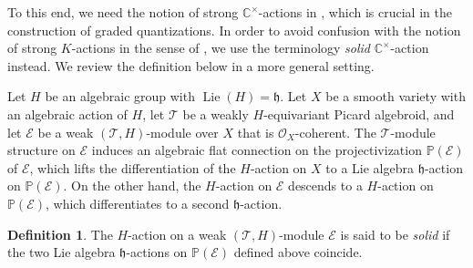 \documentclass[11pt, a4paper]{amsart}
\newcommand{\C}{\mathbb{C}}
\newcommand{\J}{\mathcal{J}}
\newcommand{\fh}{\mathfrak{h}}
\newcommand{\cE}{\mathcal{E}}
\newcommand{\hb}{\hbar}
\DeclareMathOperator{\Lie}{Lie}
\newcommand{\TT}{\mathscr{T}}
\newcommand{\tatp}{\TT^+(\Q, Y)}
\newcommand{\cm}{\C^\times}
\newcommand{\OO}{\mathcal{O}}
\newcommand{\Q}{\OO_\hb}
\theoremstyle{definition}
\newtheorem{defi}[Thm]{Definition}
\newtheorem{Rem}[Thm]{Remark}
\numberwithin{equation}{section}
\begin{document}

To this end, we need the notion of strong $\cm$-actions in \cite[Definition 4.3.2]{LY}, which is crucial in the construction of graded quantizations. In order to avoid confusion with the notion of strong $K$-actions in the sense of , we use the terminology \emph{solid} $\cm$-action instead. We review the definition below in a more general setting.

Let $H$ be an algebraic group with $\Lie(H) = \fh$. Let $X$ be a smooth variety with an algebraic action of $H$, let $\TT$ be a weakly $H$-equivariant Picard algebroid, and let $\cE$ be a weak $(\TT,H)$-module over $X$ that is $\OO_X$-coherent. The $\TT$-module structure on $\cE$ induces an algebraic flat connection on the projectivization $\mathbb{P}(\cE)$ of $\cE$, which lifts the differentiation of the $H$-action on $X$ to a Lie algebra $\fh$-action on $\mathbb{P}(\cE)$. On the other hand, the $H$-action on $\cE$ descends to a $H$-action on $\mathbb{P}(\cE)$, which differentiates to a second $\fh$-action. 

\begin{defi} \label{defn:solid}
	The $H$-action on a weak $(\TT, H)$-module $\cE$ is said to be \emph{solid} if the two Lie algebra $\fh$-actions on $\mathbb{P}(\cE)$ defined above coincide.
\end{defi}
\end{document}
